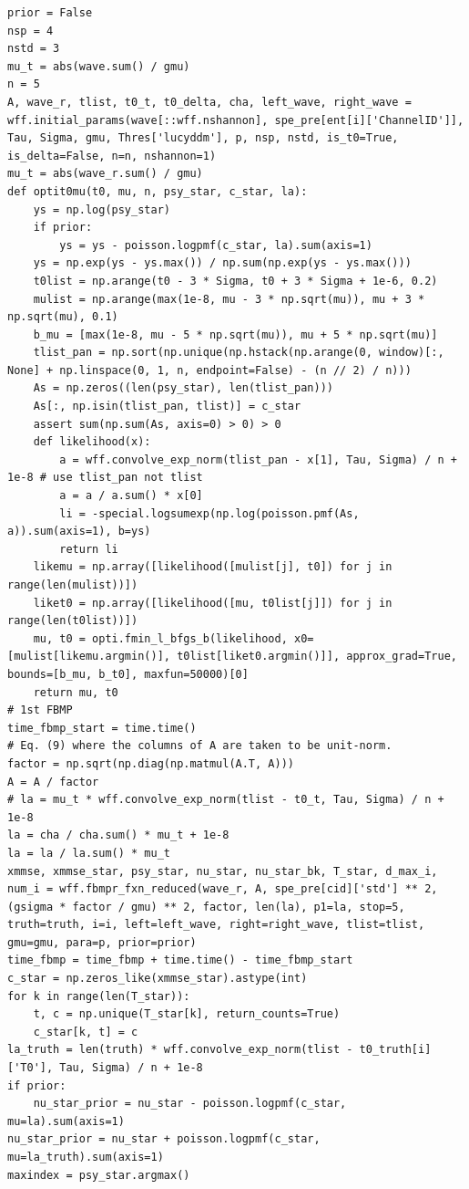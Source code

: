 \documentclass[notitlepage]{article}
\begin{document}
\begin{lstlisting}
prior = False
nsp = 4
nstd = 3
mu_t = abs(wave.sum() / gmu)
n = 5
A, wave_r, tlist, t0_t, t0_delta, cha, left_wave, right_wave = wff.initial_params(wave[::wff.nshannon], spe_pre[ent[i]['ChannelID']], Tau, Sigma, gmu, Thres['lucyddm'], p, nsp, nstd, is_t0=True, is_delta=False, n=n, nshannon=1)
mu_t = abs(wave_r.sum() / gmu)
def optit0mu(t0, mu, n, psy_star, c_star, la):
    ys = np.log(psy_star)
    if prior:
        ys = ys - poisson.logpmf(c_star, la).sum(axis=1)
    ys = np.exp(ys - ys.max()) / np.sum(np.exp(ys - ys.max()))
    t0list = np.arange(t0 - 3 * Sigma, t0 + 3 * Sigma + 1e-6, 0.2)
    mulist = np.arange(max(1e-8, mu - 3 * np.sqrt(mu)), mu + 3 * np.sqrt(mu), 0.1)
    b_mu = [max(1e-8, mu - 5 * np.sqrt(mu)), mu + 5 * np.sqrt(mu)]
    tlist_pan = np.sort(np.unique(np.hstack(np.arange(0, window)[:, None] + np.linspace(0, 1, n, endpoint=False) - (n // 2) / n)))
    As = np.zeros((len(psy_star), len(tlist_pan)))
    As[:, np.isin(tlist_pan, tlist)] = c_star
    assert sum(np.sum(As, axis=0) > 0) > 0
    def likelihood(x):
        a = wff.convolve_exp_norm(tlist_pan - x[1], Tau, Sigma) / n + 1e-8 # use tlist_pan not tlist
        a = a / a.sum() * x[0]
        li = -special.logsumexp(np.log(poisson.pmf(As, a)).sum(axis=1), b=ys)
        return li
    likemu = np.array([likelihood([mulist[j], t0]) for j in range(len(mulist))])
    liket0 = np.array([likelihood([mu, t0list[j]]) for j in range(len(t0list))])
    mu, t0 = opti.fmin_l_bfgs_b(likelihood, x0=[mulist[likemu.argmin()], t0list[liket0.argmin()]], approx_grad=True, bounds=[b_mu, b_t0], maxfun=50000)[0]
    return mu, t0
# 1st FBMP
time_fbmp_start = time.time()
# Eq. (9) where the columns of A are taken to be unit-norm.
factor = np.sqrt(np.diag(np.matmul(A.T, A)))
A = A / factor
# la = mu_t * wff.convolve_exp_norm(tlist - t0_t, Tau, Sigma) / n + 1e-8
la = cha / cha.sum() * mu_t + 1e-8
la = la / la.sum() * mu_t
xmmse, xmmse_star, psy_star, nu_star, nu_star_bk, T_star, d_max_i, num_i = wff.fbmpr_fxn_reduced(wave_r, A, spe_pre[cid]['std'] ** 2, (gsigma * factor / gmu) ** 2, factor, len(la), p1=la, stop=5, truth=truth, i=i, left=left_wave, right=right_wave, tlist=tlist, gmu=gmu, para=p, prior=prior)
time_fbmp = time_fbmp + time.time() - time_fbmp_start
c_star = np.zeros_like(xmmse_star).astype(int)
for k in range(len(T_star)):
    t, c = np.unique(T_star[k], return_counts=True)
    c_star[k, t] = c
la_truth = len(truth) * wff.convolve_exp_norm(tlist - t0_truth[i]['T0'], Tau, Sigma) / n + 1e-8
if prior:
    nu_star_prior = nu_star - poisson.logpmf(c_star, mu=la).sum(axis=1)
nu_star_prior = nu_star + poisson.logpmf(c_star, mu=la_truth).sum(axis=1)
maxindex = psy_star.argmax()


\end{lstlisting}
\end{document}
